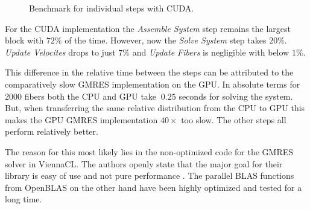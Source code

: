\documentclass[a4paper,11pt]{kth-mag}
\begin{document}
\begin{figure}[!htbp]
  \centering
  \caption{Benchmark for individual steps with CUDA.}
  \label{fig:bench_cuda_steps}
\end{figure}

For the CUDA implementation the \emph{Assemble System} step remains the largest block with $72\%$ of the time. However, now the \emph{Solve System} step takes $20\%$. \emph{Update Velocites} drops to just $7\%$ and \emph{Update Fibers} is negligible with below $1\%$.

This difference in the relative time between the steps can be attributed to the comparatively slow GMRES implementation on the GPU. In absolute terms for $2000$ fibers both the CPU and GPU take $~0.25$ seconds for solving the system. But, when transferring the same relative distribution from the CPU to GPU this makes the GPU GMRES implementation $40×$ too slow. The other steps all perform relatively better.

The reason for this most likely lies in the non-optimized code for the GMRES solver in ViennaCL. The authors openly state that the major goal for their library is easy of use and not pure performance \cite{ViennaCLRupp2010}. The parallel BLAS functions from OpenBLAS on the other hand have been highly optimized and tested for a long time.
\end{document}
